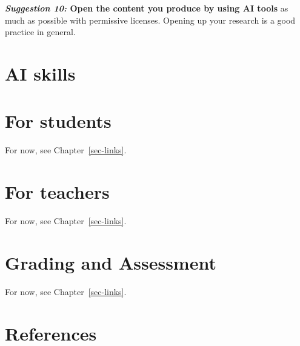 \documentclass[
  letterpaper,
  DIV=11,
  numbers=noendperiod]{scrreprt}
\begin{document}
\textbf{\emph{Suggestion 10:} Open the content you produce by using AI
tools} as much as possible with permissive licenses. Opening up your
research is a good practice in general.


\chapter{AI skills}\label{ai-skills}


\chapter{For students}\label{for-students}

For now, see Chapter~\ref{sec-links}.


\chapter{For teachers}\label{for-teachers}

For now, see Chapter~\ref{sec-links}.


\chapter{Grading and Assessment}\label{grading-and-assessment}

For now, see Chapter~\ref{sec-links}.


\chapter*{References}\label{references}

\end{document}
